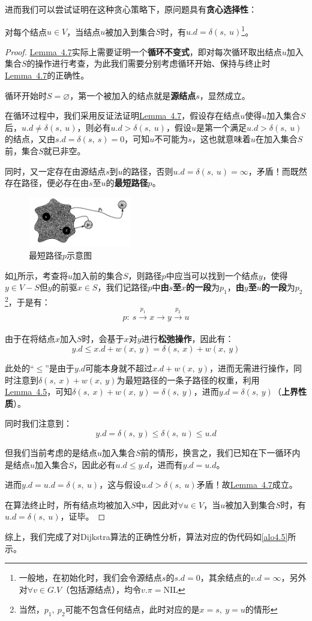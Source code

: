 \documentclass[12pt,a4paper,violet,oneside]{bbe}
\begin{document}
进而我们可以尝试证明在这种贪心策略下，原问题具有\textbf{贪心选择性}：
\begin{lemma}\label{le4.2}
	对每个结点$u\in V$，当结点$u$被加入到集合$S$时，有$u.d=\delta(s,~u)$\footnote{一般地，在初始化时，我们会令源结点$s$的$s.d=0$，其余结点的$v.d=\infty$，另外对$\forall v\in G.V$（包括源结点），均令$v.\pi=\text{NIL}$}。
\end{lemma}
\begin{proof}
	\hyperref[le4.2]{Lemma~4.7}实际上需要证明一个\textbf{循环不变式}，即对每次循环取出结点$u$加入集合$S$的操作进行考查，为此我们需要分别考虑循环开始、保持与终止时\hyperref[le4.2]{Lemma~4.7}的正确性。
	
	循环开始时$S=\varnothing$，第一个被加入的结点就是\textbf{源结点}$s$，显然成立。
	
	在循环过程中，我们采用反证法证明\hyperref[le4.2]{Lemma~4.7}，假设存在结点$u$使得$u$加入集合$S$后，$u.d\ne \delta(s,~u)$，则必有$u.d>\delta(s,~u)$，假设$u$是第一个满足$u.d>\delta(s,~u)$的结点，又由$s.d=\delta(s,~s)=0$，可知$u$不可能为$s$，这也就意味着$u$在加入集合$S$前，集合$S$就已非空。
	
	同时，又一定存在由源结点$s$到$u$的路径，否则$u.d=\delta(s,~u)=\infty$，矛盾！而既然存在路径，便必存在由$s$至$u$的\textbf{最短路径}$p$。
	\begin{figure}[!htbp]
		\centering
		\includegraphics[width=0.4\textwidth]{fig4.1}
		\caption{最短路径$p$示意图}
		\label{fig4.1}
	\end{figure}

如\cref{fig4.1}所示，考查将$u$加入前的集合$S$，则路径$p$中应当可以找到一个结点$y$，使得$y\in V-S$但$y$的前驱$x\in S$，我们记路径$p$中\textbf{由$s$至$x$的一段}为$p_1$，\textbf{由$y$至$u$的一段}为$p_2$\footnote{当然，$p_1,~p_2$可能不包含任何结点，此时对应的是$x=s,~y=u$的情形}，于是有：
$$
p:~s\xrightarrow[]{~p_1~}x\to y\xrightarrow[]{~p_2~}u
$$

由于在将结点$x$加入$S$时，会基于$x$对$y$进行\textbf{松弛操作}，因此有：
$$
y.d\leqslant x.d+w(x,~y)=\delta(s,~x)+w(x,~y)
$$

此处的“$\leqslant$”是由于$y.d$可能本身就不超过$x.d+w(x,~y)$，进而无需进行操作，同时注意到$\delta(s,~x)+w(x,~y)$为最短路径的一条子路径的权重，利用\hyperref[le4.1]{Lemma~4.5}，可知$\delta(s,~x)+w(x,~y)=\delta(s,~y)$，进而$y.d=\delta(s,~y)$（\textbf{上界性质}）。

同时我们注意到：
$$
y.d=\delta(s,~y)\leqslant\delta(s,~u)\leqslant u.d
$$

但我们当前考虑的是结点$u$加入集合$S$前的情形，换言之，我们已知在下一循环内是结点$u$加入集合$S$，因此必有$u.d\leqslant y.d$，进而有$y.d=u.d$。

进而$y.d=u.d=\delta(s,~u)$，这与假设$u.d>\delta(s,~u)$矛盾！故\hyperref[le4.2]{Lemma~4.7}成立。

在算法终止时，所有结点均被加入$S$中，因此对$\forall u\in V$，当$u$被加入到集合$S$时，有$u.d=\delta(s,~u)$，证毕。
\end{proof}

综上，我们完成了对Dijkstra算法的正确性分析，算法对应的伪代码如\cref{alo4.5}所示。
\end{document}
